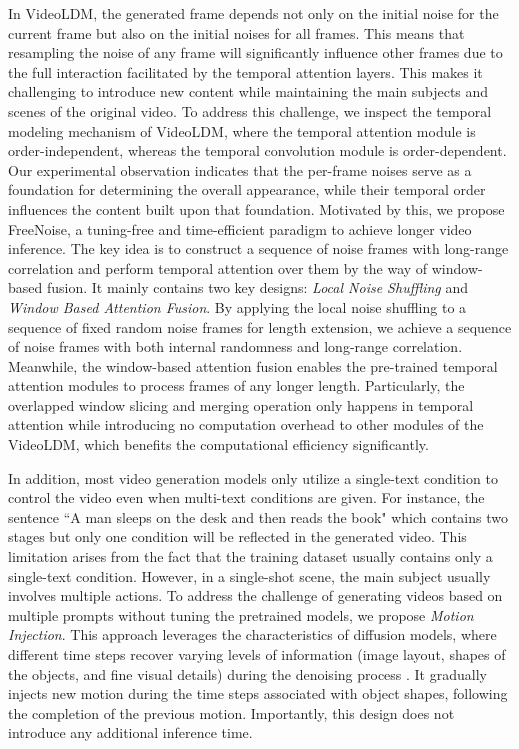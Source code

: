 In VideoLDM\citep{blattmann2023align}, the generated frame depends not only on the initial noise for the current frame but also on the initial noises for all frames. This means that resampling the noise of any frame will significantly influence other frames due to the full interaction facilitated by the temporal attention layers. This makes it challenging to introduce new content while maintaining the main subjects and scenes of the original video.
To address this challenge, we inspect the temporal modeling mechanism of VideoLDM, where the temporal attention module is order-independent, whereas the temporal convolution module is order-dependent. Our experimental observation indicates that the per-frame noises serve as a foundation for determining the overall appearance, while their temporal order influences the content built upon that foundation.
%
Motivated by this, we propose FreeNoise, a tuning-free and time-efficient paradigm to achieve longer video inference. The key idea is to construct a sequence of noise frames with long-range correlation and perform temporal attention over them by the way of window-based fusion. It mainly contains two key designs: \textit{Local Noise Shuffling} and \textit{Window Based Attention Fusion}. By applying the local noise shuffling to a sequence of fixed random noise frames for length extension, we achieve a sequence of noise frames with both internal randomness and long-range correlation. Meanwhile, the window-based attention fusion enables the pre-trained temporal attention modules to process frames of any longer length. Particularly, the overlapped window slicing and merging operation only happens in temporal attention while introducing no computation overhead to other modules of the VideoLDM, which benefits the computational efficiency significantly.

In addition, most video generation models \citep{blattmann2023align, luo2023videofusion, ge2023preserve} only utilize a single-text condition to control the video even when multi-text conditions are given. For instance, the sentence ``A man sleeps on the desk and then reads the book" which contains two stages but only one condition will be reflected in the generated video. This limitation arises from the fact that the training dataset usually contains only a single-text condition. However, in a single-shot scene, the main subject usually involves multiple actions. To address the challenge of generating videos based on multiple prompts without tuning the pretrained models, we propose \textit{Motion Injection}. This approach leverages the characteristics of diffusion models, where different time steps recover varying levels of information (image layout, shapes of the objects, and fine visual details) during the denoising process \citep{patashnik2023localizing,zhang2023prospect}. It gradually injects new motion during the time steps associated with object shapes, following the completion of the previous motion. Importantly, this design does not introduce any additional inference time.

